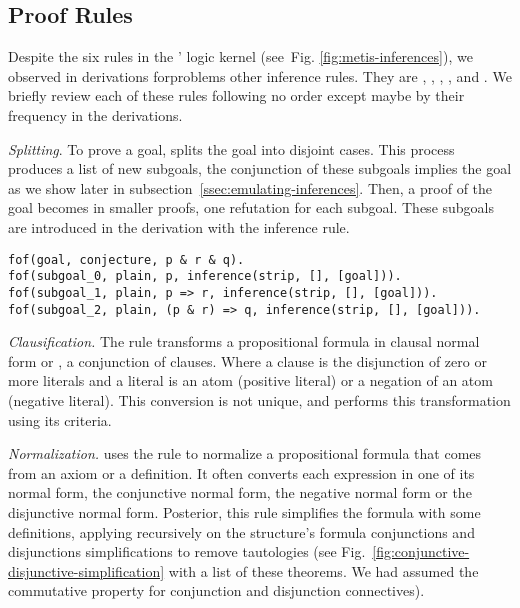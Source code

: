 \documentclass[../main.tex]{subfiles}
\begin{document}

\subsection{Proof Rules}
\label{ssec:proof-rules}

Despite the six rules in the \Metis' logic
kernel (see~Fig. \ref{fig:metis-inferences}), we observed in \TSTP
derivations for\CPL problems other inference rules.
They are \canonicalize, \conjunct, \negate, \simplify,
\strip and \resolve. We briefly review each of these rules
following no order except maybe by their frequency in the \TSTP derivations.


\textit{Splitting}.
To prove a goal, \Metis splits the goal into disjoint cases. This
process produces a list of new subgoals, the conjunction of these subgoals
implies the goal as we show later in subsection~\ref{ssec:emulating-inferences}.
Then, a proof of the goal becomes in smaller proofs, one
refutation for each subgoal. These subgoals are introduced in the \TSTP
derivation with the \strip inference rule.

\begin{verbatim}
fof(goal, conjecture, p & r & q).
fof(subgoal_0, plain, p, inference(strip, [], [goal])).
fof(subgoal_1, plain, p => r, inference(strip, [], [goal])).
fof(subgoal_2, plain, (p & r) => q, inference(strip, [], [goal])).
\end{verbatim}


\textit{Clausification.} The \clausify rule transforms a
propositional formula in clausal normal form or \CNF,
a conjunction of clauses. Where a clause is the disjunction of zero or
more literals and a literal is an atom (positive literal) or a negation of an
atom (negative literal). This conversion is not unique, and \Metis performs
this transformation using its criteria.


\textit{Normalization.}
\Metis uses the \canonicalize rule to normalize a
propositional formula that comes from an axiom or a definition.
It often converts each expression in one of its normal form,
the conjunctive normal form, the negative normal form or the disjunctive normal form.
Posterior, this rule simplifies the formula with some definitions, applying
recursively on the structure's formula conjunctions and disjunctions simplifications
to remove tautologies
(see Fig.~\ref{fig:conjunctive-disjunctive-simplification} with a list
of these theorems. We had assumed the commutative property for conjunction and
disjunction connectives).
\end{document}
